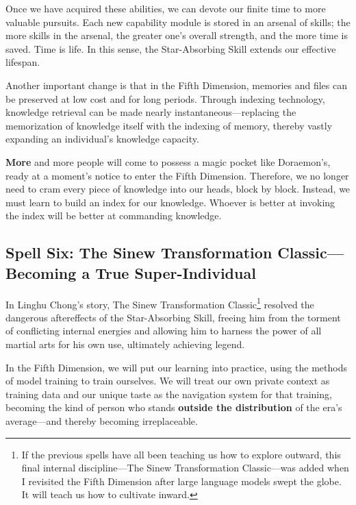\vspace{1em}

Once we have acquired these abilities, we can devote our finite time to more valuable pursuits. Each new capability module is stored in an arsenal of skills; the more skills in the arsenal, the greater one's overall strength, and the more time is saved. Time is life. In this sense, the Star-Absorbing Skill extends our effective lifespan.

\vspace{1em}

Another important change is that in the Fifth Dimension, memories and files can be preserved at low cost and for long periods. Through indexing technology, knowledge retrieval can be made nearly instantaneous---replacing the memorization of knowledge itself with the indexing of memory, thereby vastly expanding an individual's knowledge capacity.

\vspace{1em}

\textbf{More} and more people will come to possess a magic pocket like Doraemon's, ready at a moment's notice to enter the Fifth Dimension. Therefore, we no longer need to cram every piece of knowledge into our heads, block by block. Instead, we must learn to build an index for our knowledge. Whoever is better at invoking the index will be better at commanding knowledge.

\subsection{Spell Six: The Sinew Transformation Classic---Becoming a True Super-Individual}

In Linghu Chong's story, The Sinew Transformation Classic\footnote{If the previous spells have all been teaching us how to explore outward, this final internal discipline---The Sinew Transformation Classic---was added when I revisited the Fifth Dimension after large language models swept the globe. It will teach us how to cultivate inward.} resolved the dangerous aftereffects of the Star-Absorbing Skill, freeing him from the torment of conflicting internal energies and allowing him to harness the power of all martial arts for his own use, ultimately achieving legend.

\vspace{1em}

In the Fifth Dimension, we will put our learning into practice, using the methods of model training to train ourselves. We will treat our own private context as training data and our unique taste as the navigation system for that training, becoming the kind of person who stands \textbf{outside the distribution} of the era's average---and thereby becoming irreplaceable.

